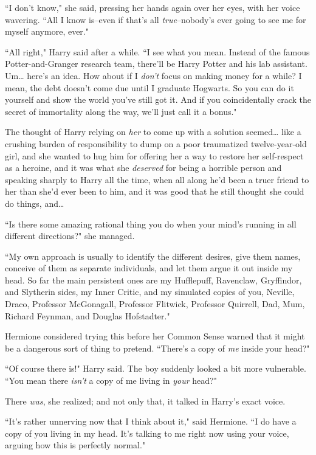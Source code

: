 ``I don't know," she said, pressing her hands again over her eyes, with her voice wavering. ``All I know is\---even if that's all \emph{true}\---nobody's ever going to see me for myself anymore, ever."

``All right," Harry said after a while. ``I see what you mean. Instead of the famous Potter-and-Granger research team, there'll be Harry Potter and his lab assistant. Um{\ldots} here's an idea. How about if I \emph{don't} focus on making money for a while? I mean, the debt doesn't come due until I graduate Hogwarts. So you can do it yourself and show the world you've still got it. And if you coincidentally crack the secret of immortality along the way, we'll just call it a bonus."

The thought of Harry relying on \emph{her} to come up with a solution seemed{\ldots} like a crushing burden of responsibility to dump on a poor traumatized twelve-year-old girl, and she wanted to hug him for offering her a way to restore her self-respect as a heroine, and it was what she \emph{deserved} for being a horrible person and speaking sharply to Harry all the time, when all along he'd been a truer friend to her than she'd ever been to him, and it was good that he still thought she could do things, and{\ldots}

``Is there some amazing rational thing you do when your mind's running in all different directions?" she managed.

``My own approach is usually to identify the different desires, give them names, conceive of them as separate individuals, and let them argue it out inside my head. So far the main persistent ones are my Hufflepuff, Ravenclaw, Gryffindor, and Slytherin sides, my Inner Critic, and my simulated copies of you, Neville, Draco, Professor McGonagall, Professor Flitwick, Professor Quirrell, Dad, Mum, Richard Feynman, and Douglas Hofstadter."

Hermione considered trying this before her Common Sense warned that it might be a dangerous sort of thing to pretend. ``There's a copy of \emph{me} inside your head?"

``Of course there is!" Harry said. The boy suddenly looked a bit more vulnerable. ``You mean there \emph{isn't} a copy of me living in \emph{your} head?"

There \emph{was}, she realized; and not only that, it talked in Harry's exact voice.

``It's rather unnerving now that I think about it," said Hermione. ``I do have a copy of you living in my head. It's talking to me right now using your voice, arguing how this is perfectly normal."

